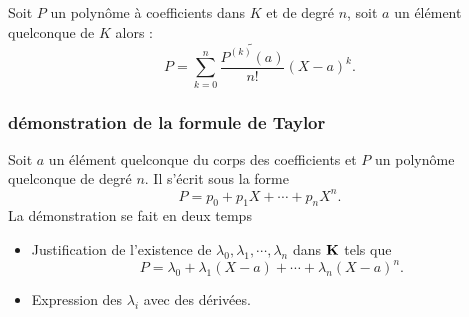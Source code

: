 \begin{frame}
\begin{thm}
Soit $P$ un polynôme à coefficients dans $K$ et de degré $n$, soit $a$ un élément quelconque de $K$ alors :
 \begin{displaymath}
 P = \sum_{k=0}^{n}\dfrac{\widetilde{P^{(k)}(a)}}{n !}(X-a)^k.
\end{displaymath}
\end{thm}
\end{frame}
\begin{demo}
\begin{frame}
\frametitle{démonstration de la formule de Taylor}
Soit $a$ un élément quelconque du corps des coefficients et $P$ un polynôme quelconque de degré $n$. Il s'écrit sous la forme
\begin{displaymath}
 P = p_0+p_1X+\cdots+p_nX^n.
\end{displaymath}
La démonstration se fait en deux temps
\begin{itemize}
 \item Justification de l'existence de $\lambda_0, \lambda_1,\cdots,\lambda_n$ dans $\mathbf{K}$ tels que
\begin{displaymath}
 P = \lambda_0+\lambda_1(X-a)+\cdots+\lambda_n(X-a)^n.
\end{displaymath}
\item Expression des $\lambda_i$ avec des dérivées.
\end{itemize}
\end{frame}


\end{demo}
